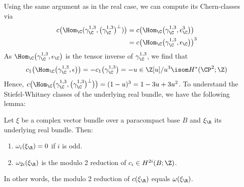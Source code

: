 Using the same argument as in the real case, we can compute its Chern-classes via
\begin{align*}
	c\big(\Hom_\C(\gamma_\C^{1, 3}, \big(\gamma_\C^{1, 3}\big)^\perp)\big) &= c\big(\Hom_\C\big(\gamma_\C^{1, 3}, \epsilon_\C^3\big)\big) \\
														   				   &= c\big(\Hom_\C\big(\gamma_\C^{1, 3}, \epsilon_\C\big)\big)^3
\end{align*}
As $\Hom_\C\big(\gamma_\C^{1, 3}, \epsilon_\C\big)$ is the tensor inverse of $\gamma_\C^{1, 3}$, we find that
\begin{equation*}
	c_1\big(\Hom_\C\big(\gamma_\C^{1, 3}, \epsilon\big)\big) = -c_1\big(\gamma_\C^{1, 3}\big) = -u \in \Z[u] / u^3 \isom H^*(\CP^2; \Z)
\end{equation*}
Hence, $c\big(\Hom_\C\big(\gamma_\C^{1, 3}, \big(\gamma_\C^{1, 3}\big)^\perp\big)\big) = (1 - u)^3 = 1 - 3u + 3u^2$.
To understand the Stiefel-Whitney classes of the underlying real bundle, we have the following lemma:
\begin{lemma}
	Let $\xi$ be a complex vector bundle over a paracompact base $B$ and $\xi_\R$ its underlying real bundle.
	Then:
	\begin{enumerate}
		\item\label{lma:swofcomplexbundle:1} $\omega_i(\xi_\R) = 0$ if $i$ is odd.
		\item\label{lma:swofcomplexbundle:2} $\omega_{2i}(\xi_\R)$ is the modulo 2 reduction of $c_i \in H^{2i}(B; \Z)$.
	\end{enumerate}
\end{lemma}
In other words, the modulo 2 reduction of $c(\xi_\R)$ equals $\omega(\xi_\R)$.
